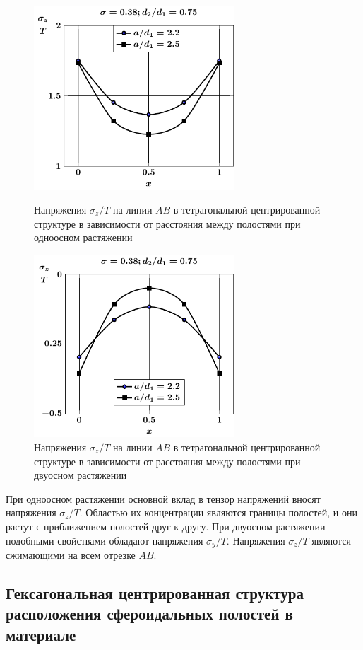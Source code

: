 \begin{figure}[h!]
\centering\footnotesize
\parbox[b]{7.5cm}{\centering\includegraphics[width=7.5cm]{cav9-a-d75-t1-sig_z.pdf}
\caption{Напряжения $\sigma_z/T$ на линии $AB$ в тетрагональной центрированной структуре в зависимости от расстояния между полостями при одноосном растяжении 
\label{f:9:40}}}\hfil\hfil
\parbox[b]{7.5cm}{\centering\includegraphics[width=7.5cm]{cav9-a-d75-t2-sig_z.pdf}
\caption{Напряжения $\sigma_z/T$ на линии $AB$ в тетрагональной центрированной структуре в зависимости от расстояния между полостями при двуосном растяжении
\label{f:9:41}}}
\end{figure}

При одноосном растяжении основной вклад в тензор напряжений вносят напряжения $\sigma_z/T$. Областью их концентрации являются границы полостей, и они растут с приближением полостей друг к другу. При двуосном растяжении подобными свойствами обладают напряжения $\sigma_y/T$. Напряжения $\sigma_z/T$ являются сжимающими на всем отрезке $AB$.

\subsection{Гексагональная центрированная структура расположения сфероидальных полостей в материале}

